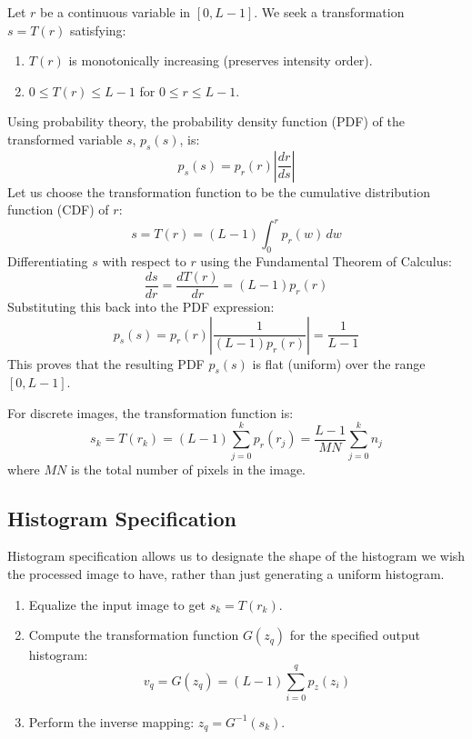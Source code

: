 \documentclass[12pt,a4paper]{article}
\begin{document}
\begin{tcolorbox}[formulabox, title={Continuous Case Derivation}]
Let $r$ be a continuous variable in $[0, L-1]$. We seek a transformation $s = T(r)$ satisfying:
\begin{enumerate}[label=(\roman*), leftmargin=*, itemsep=1pt]
  \item $T(r)$ is monotonically increasing (preserves intensity order).
  \item $0 \le T(r) \le L-1$ for $0 \le r \le L-1$.
\end{enumerate}
Using probability theory, the probability density function (PDF) of the transformed variable $s$, $p_s(s)$, is:
\begin{equation}
  p_s(s) = p_r(r) \left| \frac{dr}{ds} \right|
\end{equation}
Let us choose the transformation function to be the cumulative distribution function (CDF) of $r$:
\begin{equation}
  s = T(r) = (L-1) \int_0^r p_r(w) \, dw
\end{equation}
Differentiating $s$ with respect to $r$ using the Fundamental Theorem of Calculus:
\begin{equation}
  \frac{ds}{dr} = \frac{dT(r)}{dr} = (L-1) p_r(r)
\end{equation}
Substituting this back into the PDF expression:
\begin{equation}
  p_s(s) = p_r(r) \left| \frac{1}{(L-1) p_r(r)} \right| = \frac{1}{L-1}
\end{equation}
This proves that the resulting PDF $p_s(s)$ is flat (uniform) over the range $[0, L-1]$.
\end{tcolorbox}

For discrete images, the transformation function is:
\begin{equation}
  s_k = T(r_k) = (L-1) \sum_{j=0}^k p_r(r_j) = \frac{L-1}{MN} \sum_{j=0}^k n_j
\end{equation}
where $MN$ is the total number of pixels in the image.

\subsection{Histogram Specification}
Histogram specification allows us to designate the shape of the histogram we wish the processed image to have, rather than just generating a uniform histogram.
\begin{enumerate}[leftmargin=*, itemsep=2.5pt]
  \item Equalize the input image to get $s_k = T(r_k)$.
  \item Compute the transformation function $G(z_q)$ for the specified output histogram:
    \begin{equation}
      v_q = G(z_q) = (L-1)\sum_{i=0}^q p_z(z_i)
    \end{equation}
  \item Perform the inverse mapping: $z_q = G^{-1}(s_k)$.
\end{enumerate}
\end{document}
